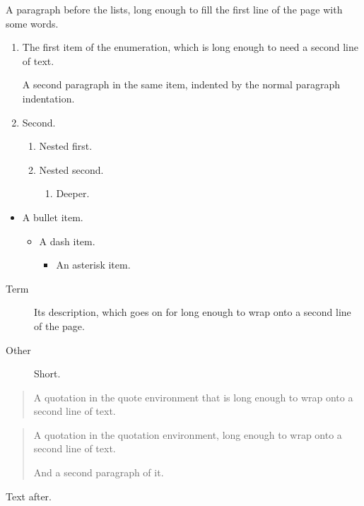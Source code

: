 \documentclass{scrartcl}
\begin{document}
A paragraph before the lists, long enough to fill the first line of the page with some words.
\begin{enumerate}
\item The first item of the enumeration, which is long enough to need a second line of text.

A second paragraph in the same item, indented by the normal paragraph indentation.
\item Second.
\begin{enumerate}
\item Nested first.
\item Nested second.
\begin{enumerate}
\item Deeper.
\end{enumerate}
\end{enumerate}
\end{enumerate}
\begin{itemize}
\item A bullet item.
\begin{itemize}
\item A dash item.
\begin{itemize}
\item An asterisk item.
\end{itemize}
\end{itemize}
\end{itemize}
\begin{description}
\item[Term] Its description, which goes on for long enough to wrap onto a second line of the page.
\item[Other] Short.
\end{description}
\begin{quote}
A quotation in the quote environment that is long enough to wrap onto a second line of text.
\end{quote}
\begin{quotation}
A quotation in the quotation environment, long enough to wrap onto a second line of text.

And a second paragraph of it.
\end{quotation}
Text after.
\end{document}
